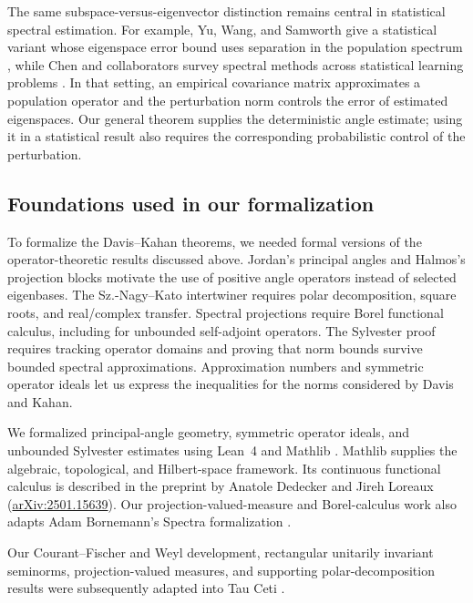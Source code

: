 \documentclass[pdflatex]{sn-jnl} %
\theoremstyle{thmstyleone}
\begin{document}
The same subspace-versus-eigenvector distinction remains central in
statistical spectral estimation.  For example, Yu, Wang, and
Samworth give a statistical variant whose eigenspace error bound uses
separation in the population spectrum \citep{yu2015davis}, while Chen and
collaborators survey spectral methods across statistical learning
problems \citep{chen2021spectral}.  In that setting, an empirical covariance matrix approximates a population
operator and the perturbation norm controls the error of estimated
eigenspaces. Our general theorem supplies the deterministic angle estimate;
using it in a statistical result also requires the corresponding probabilistic
control of the perturbation.

\subsection{Foundations used in our formalization}
\label{sec:related-formal}

To formalize the Davis--Kahan theorems, we needed formal versions of the
operator-theoretic results discussed above. Jordan's principal angles and
Halmos's projection blocks motivate the use of positive angle operators
instead of selected eigenbases.  The Sz.-Nagy--Kato intertwiner requires
polar decomposition, square roots, and real/complex transfer.
Spectral projections require Borel functional calculus, including for
unbounded self-adjoint operators.  The Sylvester proof requires tracking operator domains and proving that
norm bounds survive bounded spectral approximations. Approximation numbers
and symmetric operator ideals let us express the inequalities for the norms
considered by Davis and Kahan.

We formalized principal-angle geometry, symmetric operator ideals, and
unbounded Sylvester estimates using Lean~4 and Mathlib
\citep{demoura2021lean4,mathlib2020}. Mathlib supplies the algebraic,
topological, and Hilbert-space framework. Its continuous functional calculus
is described in the preprint by Anatole Dedecker and Jireh Loreaux
(\href{https://arxiv.org/abs/2501.15639}{arXiv:2501.15639}).
Our projection-valued-measure and Borel-calculus
work also adapts Adam Bornemann's Spectra formalization
\citep{bornemann2026spectra}.

Our Courant--Fischer and Weyl development, rectangular unitarily invariant
seminorms, projection-valued measures, and supporting polar-decomposition
results were subsequently adapted into Tau Ceti \citep{tauceti2026}.
\end{document}
